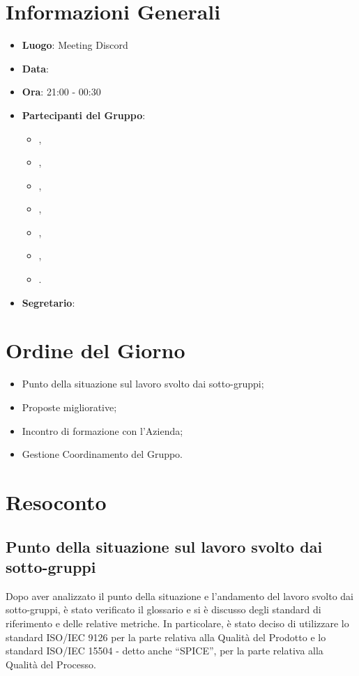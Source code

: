 \section{Informazioni Generali}

\begin{itemize}
\item{\textbf{Luogo}}: Meeting Discord
\item{\textbf{Data}}: \D{}
\item{\textbf{Ora}}: 21:00 - 00:30
\item{\textbf{Partecipanti del Gruppo}}: 
	\begin{itemize}
	\item{\EP{},} 
	\item{\FP{},}
	\item{\GC{},}
	\item{\LW{},}
	\item{\MB{},}
	\item{\MG{},}
	\item{\PV{}.}
	\end{itemize} 
\item{\textbf{Segretario}}: \PV{}	
\end{itemize}

\section{Ordine del Giorno}
\begin{itemize}
\item{Punto della situazione sul lavoro svolto dai sotto-gruppi;}
\item{Proposte migliorative;}
\item{Incontro di formazione con l'Azienda;}
\item{Gestione Coordinamento del Gruppo.}
\end{itemize}

\section{Resoconto}

\subsection{Punto della situazione sul lavoro svolto dai sotto-gruppi}

Dopo aver analizzato il punto della situazione e l'andamento del lavoro svolto dai sotto-gruppi, è stato verificato il glossario e si è discusso degli standard di riferimento e delle relative metriche. In particolare, è stato deciso di utilizzare lo standard ISO/IEC 9126 per la parte relativa alla Qualità del Prodotto e lo standard ISO/IEC 15504 - detto anche “SPICE”, per la parte relativa alla Qualità del Processo.

